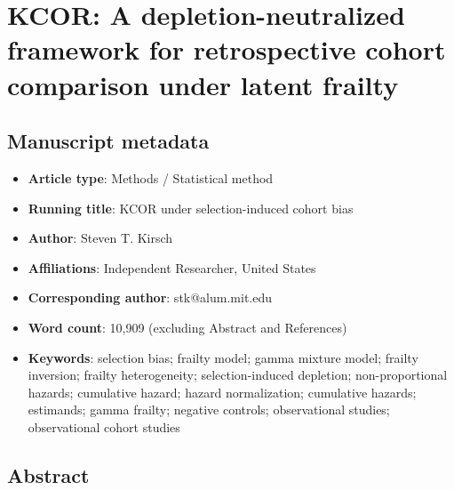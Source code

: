 \documentclass[
]{article}
\author{}
\date{}
\providecommand{\tightlist}{%
  \setlength{\itemsep}{0pt}\setlength{\parskip}{0pt}}
\begin{document}
\section{KCOR: A depletion-neutralized framework for retrospective
cohort comparison under latent
frailty}\label{kcor-a-depletion-neutralized-framework-for-retrospective-cohort-comparison-under-latent-frailty}

\subsection{Manuscript metadata}\label{manuscript-metadata}

\begin{itemize}
\tightlist
\item
  \textbf{Article type}: Methods / Statistical method
\item
  \textbf{Running title}: KCOR under selection-induced cohort bias
\item
  \textbf{Author}: Steven T. Kirsch
\item
  \textbf{Affiliations}: Independent Researcher, United States
\item
  \textbf{Corresponding author}: stk@alum.mit.edu
\item
  \textbf{Word count}: 10,909 (excluding Abstract and References)
\item
  \textbf{Keywords}: selection bias; frailty model; gamma mixture model;
  frailty inversion; frailty heterogeneity; selection-induced depletion;
  non-proportional hazards; cumulative hazard; hazard normalization;
  cumulative hazards; estimands; gamma frailty; negative controls;
  observational studies; observational cohort studies
\end{itemize}

\subsection{Abstract}\label{abstract}
\end{document}
